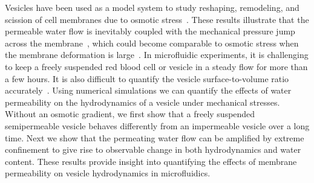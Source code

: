 \documentclass[9pt,twocolumn,twoside,lineno]{pnas-new}
\begin{document}
Vesicles 
have been used as a
model system to study reshaping, remodeling, and scission of cell
membranes due to osmotic stress~\cite{OgleckaEtAl2014_eLife, BhatiaRobinsonDimova2020_SoftMatt,
CamposSaric2020_bioRxiv, Dimova2020_GVB, BhatiaChrist2020_SoftMatt}.
These results illustrate that the permeable water
flow is inevitably coupled with the mechanical pressure jump across the
membrane~\cite{yao-mor2017}, which could become comparable to osmotic
stress when the membrane deformation is large~\cite{LiMoriSun2015_PRL,
yao-mor2017}. 
%
In microfluidic experiments, it is challenging to keep a freely
suspended red blood cell or vesicle in a steady flow for more than a few
hours. It is also difficult to quantify the vesicle surface-to-volume
ratio accurately~\cite{MinetttiCallensCoupier2008_AppliedOptics}. Using
numerical simulations we can quantify the effects of water permeability
on the hydrodynamics of a vesicle under mechanical stresses.  
Without an osmotic gradient, we first show that a freely suspended
semipermeable vesicle behaves differently from an impermeable vesicle
over a long time. Next we show that
the permeating water flow can be amplified by extreme confinement to give rise to observable change in both hydrodynamics and water content. 
These results provide insight into quantifying the effects of membrane permeability on vesicle hydrodynamics in microfluidics.
%
 
\end{document}
